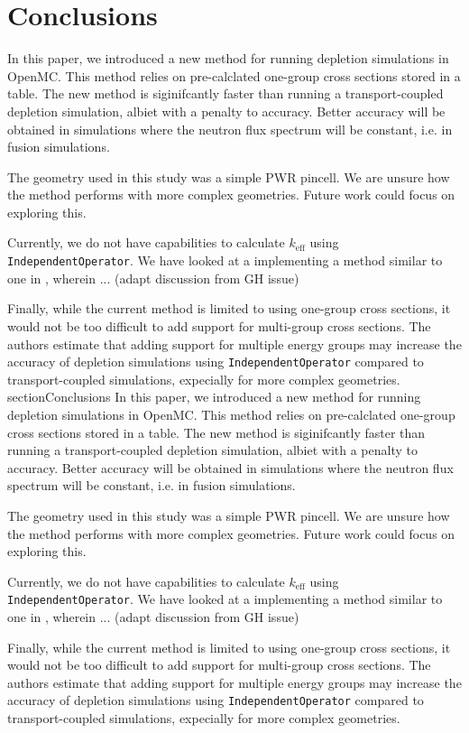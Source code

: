 \section{Conclusions}\label{sec:conclusion}
    In this paper, we introduced a new method for running depletion simulations
    in OpenMC. This method relies on pre-calclated one-group cross sections
    stored in a table. The new method is siginifcantly faster than running a
    transport-coupled depletion simulation, albiet with a penalty to accuracy.
    Better accuracy will be obtained in simulations where the neutron flux
    spectrum will be constant, i.e. in fusion simulations.
    
    The geometry used in this study was a simple PWR pincell. We are unsure how
    the method performs with more complex geometries. Future work could
    focus on exploring this.
     
    Currently, we do not have capabilities to calculate $k_\text{eff}$ using
    \verb.IndependentOperator.. We have looked at a implementing a method
    similar to one in  \cite{LOVECKY2014333}, wherein ... (adapt discussion from
    GH issue)

    Finally, while the current method is limited to using one-group cross
    sections, it would not be too difficult to add support for multi-group cross
    sections. The authors estimate that adding support for multiple energy
    groups may increase the accuracy of depletion simulations using
    \verb.IndependentOperator. compared to transport-coupled simulations,
    expecially for more complex geometries.
section{Conclusions}\label{sec:conclusion}
    In this paper, we introduced a new method for running depletion simulations
    in OpenMC. This method relies on pre-calclated one-group cross sections
    stored in a table. The new method is siginifcantly faster than running a
    transport-coupled depletion simulation, albiet with a penalty to accuracy.
    Better accuracy will be obtained in simulations where the neutron flux
    spectrum will be constant, i.e. in fusion simulations.
    
    The geometry used in this study was a simple PWR pincell. We are unsure how
    the method performs with more complex geometries. Future work could
    focus on exploring this.
     
    Currently, we do not have capabilities to calculate $k_\text{eff}$ using
    \verb.IndependentOperator.. We have looked at a implementing a method
    similar to one in  \cite{LOVECKY2014333}, wherein ... (adapt discussion from
    GH issue)

    Finally, while the current method is limited to using one-group cross
    sections, it would not be too difficult to add support for multi-group cross
    sections. The authors estimate that adding support for multiple energy
    groups may increase the accuracy of depletion simulations using
    \verb.IndependentOperator. compared to transport-coupled simulations,
    expecially for more complex geometries.

